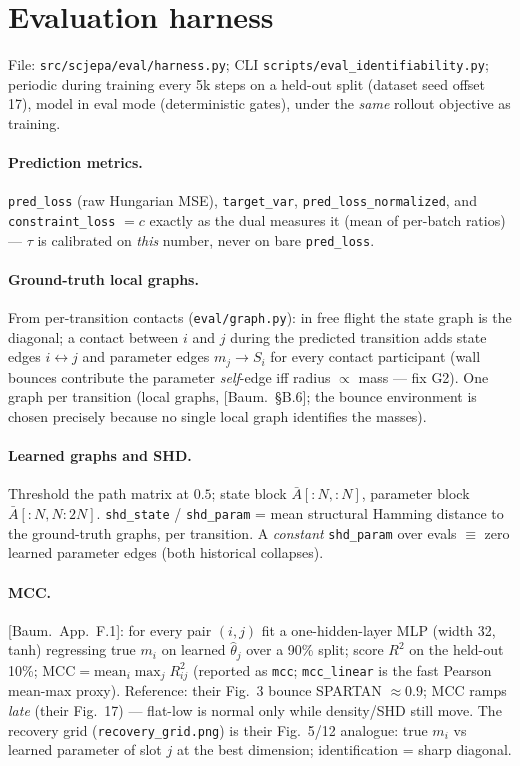 \documentclass[11pt]{article}
\newcommand{\code}[1]{\texttt{\small #1}}
\newcommand{\paper}[1]{\textcolor{blue!60!black}{[#1]}}
\newcommand{\Abar}{\bar{A}}
\begin{document}
\section{Evaluation harness}
\label{sec:eval}
File: \code{src/scjepa/eval/harness.py}; CLI \code{scripts/eval\_identifiability.py};
periodic during training every 5k steps on a held-out split (dataset seed offset 17),
model in eval mode (deterministic gates), under the \emph{same} rollout objective as
training.

\paragraph{Prediction metrics.} \code{pred\_loss} (raw Hungarian MSE),
\code{target\_var}, \code{pred\_loss\_normalized}, and
\code{constraint\_loss} $= c$ exactly as the dual measures it (mean of per-batch ratios)
--- $\tau$ is calibrated on \emph{this} number, never on bare \code{pred\_loss}.

\paragraph{Ground-truth local graphs.} From per-transition contacts
(\code{eval/graph.py}): in free flight the state graph is the diagonal; a contact between
$i$ and $j$ during the predicted transition adds state edges $i \leftrightarrow j$ and
parameter edges $m_j \to S_i$ for every contact participant (wall bounces contribute the
parameter \emph{self}-edge iff radius $\propto$ mass --- fix G2). One graph per transition
(local graphs, \paper{Baum.\ \S B.6}; the bounce environment is chosen precisely because
no single local graph identifies the masses).

\paragraph{Learned graphs and SHD.} Threshold the path matrix at $0.5$; state block
$\Abar[:N,:N]$, parameter block $\Abar[:N,N{:}2N]$. \code{shd\_state} / \code{shd\_param}
= mean structural Hamming distance to the ground-truth graphs, per transition. A
\emph{constant} \code{shd\_param} over evals $\equiv$ zero learned parameter edges (both
historical collapses).

\paragraph{MCC.} \paper{Baum.\ App.~F.1}: for every pair $(i,j)$ fit a one-hidden-layer
MLP (width 32, tanh) regressing true $m_i$ on learned $\hat\theta_j$ over a 90\% split;
score $R^2$ on the held-out 10\%;
$\mathrm{MCC} = \mathrm{mean}_i \max_j R^2_{ij}$ (reported as \code{mcc};
\code{mcc\_linear} is the fast Pearson mean-max proxy). Reference: their Fig.~3 bounce
SPARTAN $\approx0.9$; MCC ramps \emph{late} (their Fig.~17) --- flat-low is normal only
while density/SHD still move. The recovery grid (\code{recovery\_grid.png}) is their
Fig.~5/12 analogue: true $m_i$ vs learned parameter of slot $j$ at the best dimension;
identification = sharp diagonal.
\end{document}
